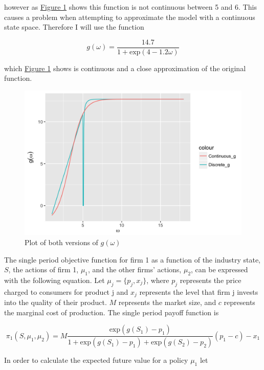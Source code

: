 \documentclass[12pt]{article}
\begin{document}
however as \hyperref[plot_g]{Figure 1} shows this function is not continuous between 5 and 6. This causes a problem when attempting to approximate the model with a continuous state space. Therefore I will use the function

\begin{equation*}
  g(\omega) = \frac{14.7}{1+\text{exp}(4-1.2\omega)}
\end{equation*}

which \hyperref[plot_g]{Figure 1} shows is continuous and a close approximation of the original function.

\begin{figure}[H]
  \centering
  \includegraphics{plot_g}
  \caption{Plot of both versions of $g(\omega)$}
  \label{plot_g}
\end{figure}

The single period objective function for firm 1 as a function of the industry state, $S$, the actions of firm 1, $\mu_1$, and the other firms' actions, $\mu_2$, can be expressed with the following equation. Let $\mu_j=\{p_j,x_j\}$, where $p_j$ represents the price charged to consumers for product j and $x_j$ represents the level that firm j invests into the quality of their product. $M$ represents the market size, and $c$ represents the marginal cost of production. The single period payoff function is

\begin{equation*}
  \pi_1(S,\mu_{1},\mu_{2})=M \frac{\text{exp}(g(S_1)-p_1)}{1+\text{exp}(g(S_1)-p_1)+\text{exp}(g(S_2)-p_2)} (p_1-c)-x_1
\end{equation*}

In order to calculate the expected future value for a policy $\mu_1$ let
\end{document}

